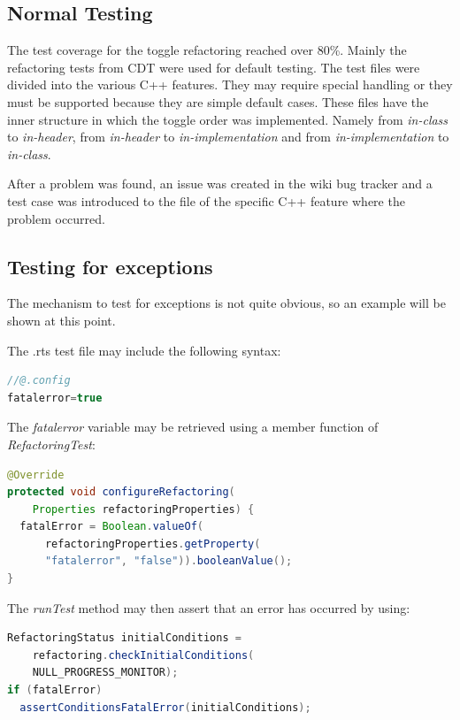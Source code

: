 \subsection{Normal Testing}

The test coverage for the toggle refactoring reached over 80\%. Mainly the
refactoring tests from CDT were used for default testing. The test files were
divided into the various C++ features. They may require special handling or they
must be supported because they are simple default cases. These files have the
inner structure in which the toggle order was implemented. Namely from
\textit{in-class} to \textit{in-header}, from \textit{in-header} to
\textit{in-implementation} and from \textit{in-implementation} to
\textit{in-class}.

After a problem was found, an issue was created in the wiki bug tracker and a
test case was introduced to the file of the specific C++ feature where the
problem occurred.

\subsection{Testing for exceptions}
The mechanism to test for exceptions is not quite obvious, so an example will be
shown at this point. 

The .rts test file may include the following syntax:

\begin{lstlisting}[caption={Syntax to set variables inside a .rts file},
language=java]
//@.config
fatalerror=true
\end{lstlisting}

The \textit{fatalerror} variable may be retrieved using a member function of \textit{RefactoringTest}:
\begin{lstlisting}[caption={Accessing a property set in the .rts file},
language=java]
@Override
protected void configureRefactoring(
    Properties refactoringProperties) {
  fatalError = Boolean.valueOf(
      refactoringProperties.getProperty(
      "fatalerror", "false")).booleanValue();
}
\end{lstlisting}

The \textit{runTest} method may then assert that an error has occurred by using:
\begin{lstlisting}[caption={Checking for errors inside the refactoring test class},language=java]
RefactoringStatus initialConditions = 
    refactoring.checkInitialConditions(
    NULL_PROGRESS_MONITOR);
if (fatalError)
  assertConditionsFatalError(initialConditions);
\end{lstlisting}

